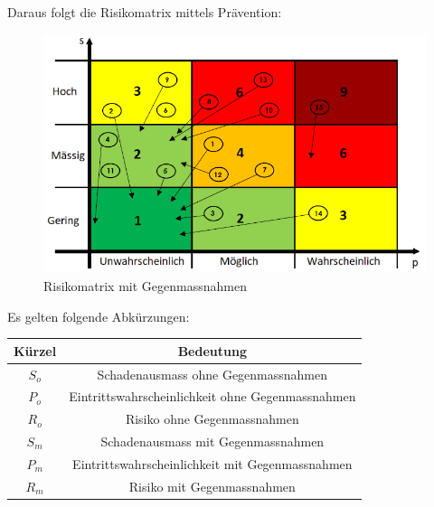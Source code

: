 \documentclass[10pt,a4paper,oneside]{99_fhnwreport}
\begin{document}
Daraus folgt die Risikomatrix mittels Prävention:

\begin{figure}[htbp]
	\centering
	\includegraphics[width=13.5cm]{risiko2.png}
		\caption{Risikomatrix mit Gegenmassnahmen}
\end{figure}

Es gelten folgende Abkürzungen: 

\begin{center}

	\begin{tabular}{|c|c|}
		\hline
		 \textbf{Kürzel} &  \textbf{Bedeutung} \\ \hline
		$S_{o}$ & Schadenausmass ohne Gegenmassnahmen \\ \hline
		$P_{o}$ & Eintrittswahrscheinlichkeit ohne Gegenmassnahmen \\ \hline
		$R_{o}$ & Risiko ohne Gegenmassnahmen \\ \hline
		$S_{m}$ & Schadenausmass mit Gegenmassnahmen \\ \hline
		$P_{m}$ & Eintrittswahrscheinlichkeit mit  Gegenmassnahmen \\ \hline
		$R_{m}$ & Risiko mit Gegenmassnahmen \\ \hline 
	\end{tabular}

\end{center}
\end{document}
